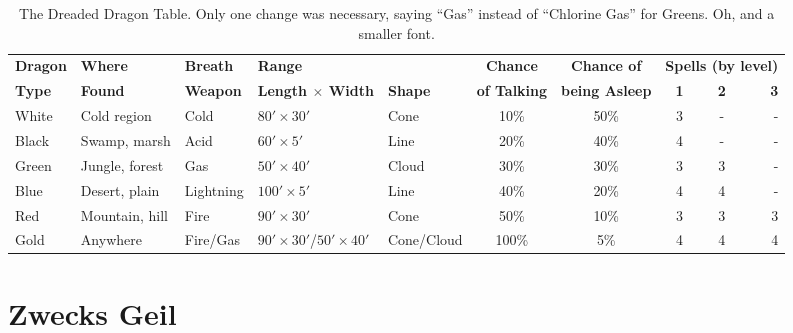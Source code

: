 \documentclass[11pt]{bxart}
\newcommand{\f}{\bfseries}
\begin{document}
\begin{table*}
\small
\centering
\begin{tabular}{lllllccc@{\quad\quad\quad}cr}
\f Dragon & \f Where   & \f Breath & \f Range                   & \f       & \f Chance     & \f Chance of    & \multicolumn{3}{c}{\f Spells (by level)}\\
\f Type   & \f Found   & \f Weapon & \f Length \(\times\) Width & \f Shape & \f of Talking & \f being Asleep & \f 1 & \f 2 & \f 3\\
\cmidrule(lr){1-1}\cmidrule(lr){2-2}\cmidrule(lr){3-3}\cmidrule(lr){4-4}\cmidrule(lr){5-5}\cmidrule(lr){6-6}\cmidrule(lr){7-7}\cmidrule(lr){8-10}
White & Cold region    & Cold      & \(80' \times 30'\)         & Cone     &  10\% & 50\% & 3 & - & -\\
Black & Swamp, marsh   & Acid      & \(60' \times 5'\)          & Line     &  20\% & 40\% & 4 & - & -\\
Green & Jungle, forest & Gas       & \(50' \times 40'\)         & Cloud    &  30\% & 30\% & 3 & 3 & -\\
Blue  & Desert, plain  & Lightning & \(100' \times 5'\)         & Line     &  40\% & 20\% & 4 & 4 & -\\
Red   & Mountain, hill & Fire      & \(90' \times 30'\)         & Cone     &  50\% & 10\% & 3 & 3 & 3\\
Gold  & Anywhere       & Fire/Gas  & \(90' \times 30'\)/\(50' \times 40'\) & Cone/Cloud & 100\% &  5\% & 4 & 4 & 4\\
\end{tabular}
\caption{The Dreaded Dragon Table. Only one change was necessary, saying
``Gas'' instead of ``Chlorine Gas'' for Greens. Oh, and a smaller font.}
\label{dragons}
\end{table*}

\section{Zwecks Geil}
\lipsum[21-28]
\end{document}
